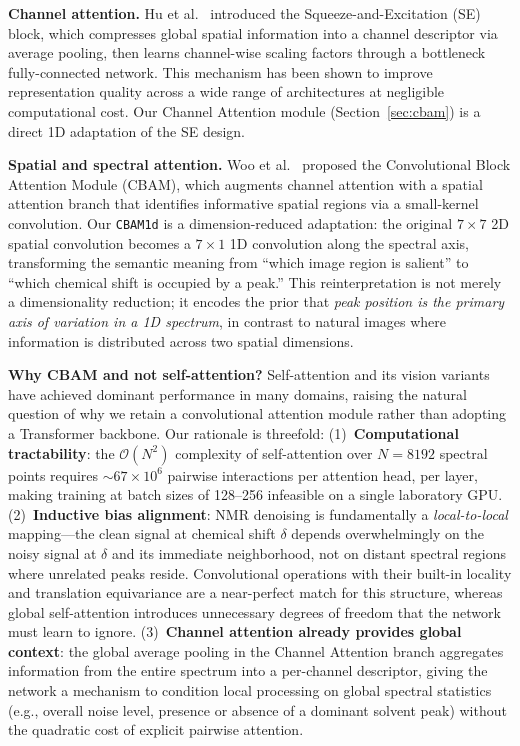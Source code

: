 \textbf{Channel attention.}
Hu et al.\ \cite{Hu2018} introduced the Squeeze-and-Excitation (SE) block,
which compresses global spatial information into a channel descriptor via
average pooling, then learns channel-wise scaling factors through a
bottleneck fully-connected network. This mechanism has been shown to
improve representation quality across a wide range of architectures at
negligible computational cost. Our Channel Attention module
(Section~\ref{sec:cbam}) is a direct 1D adaptation of the SE design.

\textbf{Spatial and spectral attention.}
Woo et al.\ \cite{Woo2018} proposed the Convolutional Block Attention Module
(CBAM), which augments channel attention with a spatial attention branch
that identifies informative spatial regions via a small-kernel convolution.
Our \texttt{CBAM1d} is a dimension-reduced adaptation: the original
$7 \times 7$ 2D spatial convolution becomes a $7 \times 1$ 1D convolution
along the spectral axis, transforming the semantic meaning from
``which image region is salient'' to ``which chemical shift is occupied by
a peak.'' This reinterpretation is not merely a dimensionality reduction;
it encodes the prior that \emph{peak position is the primary axis of
variation in a 1D spectrum}, in contrast to natural images where
information is distributed across two spatial dimensions.

\textbf{Why CBAM and not self-attention?}
Self-attention \cite{Vaswani2017} and its vision variants \cite{Dosovitskiy2021}
have achieved dominant performance in many domains, raising the natural
question of why we retain a convolutional attention module rather than
adopting a Transformer backbone. Our rationale is threefold:
(1)~\textbf{Computational tractability}: the $\mathcal{O}(N^2)$ complexity of
self-attention over $N = 8192$ spectral points requires
${\sim}67 \times 10^6$ pairwise interactions per attention head, per layer,
making training at batch sizes of 128--256 infeasible on a single laboratory
GPU.
(2)~\textbf{Inductive bias alignment}: NMR denoising is fundamentally a
\emph{local-to-local} mapping---the clean signal at chemical shift $\delta$
depends overwhelmingly on the noisy signal at $\delta$ and its immediate
neighborhood, not on distant spectral regions where unrelated peaks reside.
Convolutional operations with their built-in locality and translation
equivariance are a near-perfect match for this structure, whereas global
self-attention introduces unnecessary degrees of freedom that the network
must learn to ignore.
(3)~\textbf{Channel attention already provides global context}: the global
average pooling in the Channel Attention branch aggregates information from
the entire spectrum into a per-channel descriptor, giving the network a
mechanism to condition local processing on global spectral statistics
(e.g., overall noise level, presence or absence of a dominant solvent peak)
without the quadratic cost of explicit pairwise attention.

